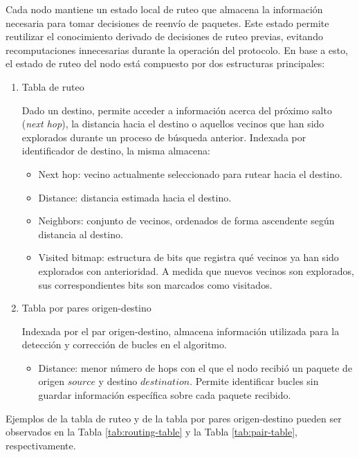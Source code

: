 Cada nodo mantiene un estado local de ruteo que almacena la información necesaria para tomar decisiones de reenvío de paquetes. Este estado permite reutilizar el conocimiento derivado de decisiones de ruteo previas, evitando recomputaciones innecesarias durante la operación del protocolo. En base a esto, el estado de ruteo del nodo está compuesto por dos estructuras principales:

\begin{enumerate}
    \item Tabla de ruteo

    Dado un destino, permite acceder a información acerca del próximo salto (\textit{next hop}), la distancia hacia el destino o aquellos vecinos que han sido explorados durante un proceso de búsqueda anterior. Indexada por identificador de destino, la misma almacena:
    \begin{itemize}
        \item Next hop: vecino actualmente seleccionado para rutear hacia el destino.
        \item Distance: distancia estimada hacia el destino.
        \item Neighbors: conjunto de vecinos, ordenados de forma ascendente según distancia al destino.
        \item Visited bitmap: estructura de bits que registra qué vecinos ya han sido explorados con anterioridad. A medida que nuevos vecinos son explorados, sus correspondientes bits son marcados como visitados.
    \end{itemize}

    \item Tabla por pares origen-destino

    Indexada por el par origen-destino, almacena información utilizada para la detección y corrección de bucles en el algoritmo.

    \begin{itemize}
        \item Distance: menor número de hops con el que el nodo recibió un paquete de origen $source$ y destino $destination$. Permite identificar bucles sin guardar información específica sobre cada paquete recibido.
    \end{itemize}
\end{enumerate}

Ejemplos de la tabla de ruteo y de la tabla por pares origen-destino pueden ser observados en la Tabla \ref{tab:routing-table} y la Tabla \ref{tab:pair-table}, respectivamente.
